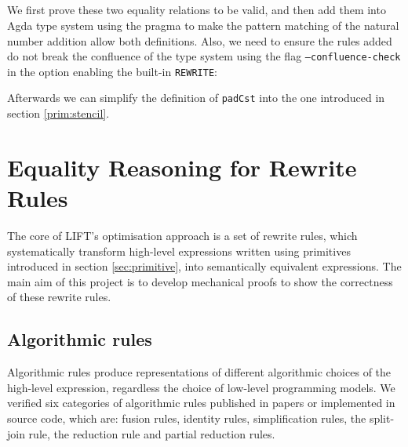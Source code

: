 \documentclass{l4proj}
\begin{document}
\begin{code}
\\
\>[2][@{}l@{\AgdaIndent{0}}]%
\>[4]\AgdaSpace{}%
\AgdaOperator{\AgdaPrimitive{+}}\AgdaSpace{}%
\AgdaSpace{}%
\AgdaOperator{\AgdaPrimitive{+}}\AgdaSpace{}%
\<%
\\
%
\>[2]\AgdaSpace{}%
\AgdaSpace{}%
\AgdaSymbol{(}\AgdaOperator{\AgdaPrimitive{\AgdaUnderscore{}+}}\AgdaSpace{}%
\AgdaSymbol{)}\AgdaSpace{}%
\AgdaSymbol{(}\AgdaSpace{}%
\AgdaSpace{}%
\AgdaSymbol{)}\AgdaSpace{}%
\<%
\\
\>[2][@{}l@{\AgdaIndent{0}}]%
\>[4]\<%
\\
\>[0]\AgdaSymbol{\{-\#}\AgdaSpace{}%
\AgdaSpace{}%
\AgdaSpace{}%
\AgdaSpace{}%
\AgdaSymbol{\#-\}}\<%
\end{code}
We first prove these two equality relations to be valid, and then add them into Agda type system using the  pragma to make the pattern matching of the natural number addition allow both definitions. Also, we need to ensure the rules added do not break the confluence of the type system using the flag \texttt{--confluence-check} in the option enabling the built-in \texttt{REWRITE}:
\begin{code}%
\>[0]\AgdaSymbol{\{-\#}\AgdaSpace{}%
\AgdaSpace{}%
\AgdaSpace{}%
\AgdaSpace{}%
\AgdaSpace{}%
\AgdaSymbol{\#-\}}\<%
\end{code}
Afterwards we can simplify the definition of \texttt{padCst} into the one introduced in section \ref{prim:stencil}.
\chapter{Equality Reasoning for Rewrite Rules}
\label{ch:proofs}
The core of LIFT's optimisation approach is a set of rewrite rules, which systematically transform high-level expressions written using primitives introduced in section \ref{sec:primitive}, into semantically equivalent expressions. The main aim of this project is to develop mechanical proofs to show the correctness of these rewrite rules.

\section{Algorithmic rules}
\label{sec:alg}
Algorithmic rules produce representations of different algorithmic choices of the high-level expression, regardless the choice of low-level programming models. We verified six categories of algorithmic rules published in papers \citep{steuwer2015improving, steuwer2015generating} or implemented in source code, which are: fusion rules, identity rules, simplification rules, the split-join rule, the reduction rule and partial reduction rules.
\end{document}
